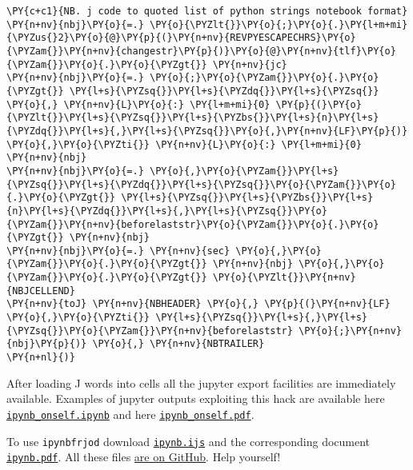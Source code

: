 \begin{tcolorbox}[breakable, size=fbox, boxrule=1pt, pad at break*=1mm,colback=cellbackground, colframe=cellborder]
\begin{Verbatim}[commandchars=\\\{\}]
\PY{c+c1}{NB. j code to quoted list of python strings notebook format}
\PY{n+nv}{nbj}\PY{o}{=.} \PY{o}{\PYZlt{}}\PY{o}{;}\PY{o}{.}\PY{l+m+mi}{\PYZus{}2}\PY{o}{@}\PY{p}{(}\PY{n+nv}{REVPYESCAPECHRS}\PY{o}{\PYZam{}}\PY{n+nv}{changestr}\PY{p}{)}\PY{o}{@}\PY{n+nv}{tlf}\PY{o}{\PYZam{}}\PY{o}{.}\PY{o}{\PYZgt{}} \PY{n+nv}{jc}
\PY{n+nv}{nbj}\PY{o}{=.} \PY{o}{;}\PY{o}{\PYZam{}}\PY{o}{.}\PY{o}{\PYZgt{}} \PY{l+s}{\PYZsq{}}\PY{l+s}{\PYZdq{}}\PY{l+s}{\PYZsq{}} \PY{o}{,} \PY{n+nv}{L}\PY{o}{:} \PY{l+m+mi}{0} \PY{p}{(}\PY{o}{\PYZlt{}}\PY{l+s}{\PYZsq{}}\PY{l+s}{\PYZbs{}}\PY{l+s}{n}\PY{l+s}{\PYZdq{}}\PY{l+s}{,}\PY{l+s}{\PYZsq{}}\PY{o}{,}\PY{n+nv}{LF}\PY{p}{)} \PY{o}{,}\PY{o}{\PYZti{}} \PY{n+nv}{L}\PY{o}{:} \PY{l+m+mi}{0} \PY{n+nv}{nbj}
\PY{n+nv}{nbj}\PY{o}{=.} \PY{o}{,}\PY{o}{\PYZam{}}\PY{l+s}{\PYZsq{}}\PY{l+s}{\PYZdq{}}\PY{l+s}{\PYZsq{}}\PY{o}{\PYZam{}}\PY{o}{.}\PY{o}{\PYZgt{}} \PY{l+s}{\PYZsq{}}\PY{l+s}{\PYZbs{}}\PY{l+s}{n}\PY{l+s}{\PYZdq{}}\PY{l+s}{,}\PY{l+s}{\PYZsq{}}\PY{o}{\PYZam{}}\PY{n+nv}{beforelaststr}\PY{o}{\PYZam{}}\PY{o}{.}\PY{o}{\PYZgt{}} \PY{n+nv}{nbj}
\PY{n+nv}{nbj}\PY{o}{=.} \PY{n+nv}{sec} \PY{o}{,}\PY{o}{\PYZam{}}\PY{o}{.}\PY{o}{\PYZgt{}} \PY{n+nv}{nbj} \PY{o}{,}\PY{o}{\PYZam{}}\PY{o}{.}\PY{o}{\PYZgt{}} \PY{o}{\PYZlt{}}\PY{n+nv}{NBJCELLEND}
\PY{n+nv}{toJ} \PY{n+nv}{NBHEADER} \PY{o}{,} \PY{p}{(}\PY{n+nv}{LF} \PY{o}{,}\PY{o}{\PYZti{}} \PY{l+s}{\PYZsq{}}\PY{l+s}{,}\PY{l+s}{\PYZsq{}}\PY{o}{\PYZam{}}\PY{n+nv}{beforelaststr} \PY{o}{;}\PY{n+nv}{nbj}\PY{p}{)} \PY{o}{,} \PY{n+nv}{NBTRAILER}
\PY{n+nl}{)}
\end{Verbatim}
\end{tcolorbox}

After loading J words into cells all the jupyter export facilities are
immediately available. Examples of jupyter outputs exploiting this hack
are available here
\href{https://github.com/bakerjd99/jacks/blob/master/ipynbfrjod/ipynb_onself.ipynb}{\texttt{ipynb\_onself.ipynb}}
and here
\href{https://github.com/bakerjd99/jacks/blob/master/ipynbfrjod/ipynb_onself.pdf}{\texttt{ipynb\_onself.pdf}}.

To use \texttt{ipynbfrjod} download
\href{https://github.com/bakerjd99/jacks/blob/master/ipynbfrjod/ipynb.ijs}{\texttt{ipynb.ijs}}
and the corresponding document
\href{https://github.com/bakerjd99/jacks/blob/master/ipynbfrjod/ipynb.pdf}{\texttt{ipynb.pdf}}.
All these files
\href{https://github.com/bakerjd99/jacks/tree/master/ipynbfrjod}{are on
GitHub}. Help yourself!

%


%


